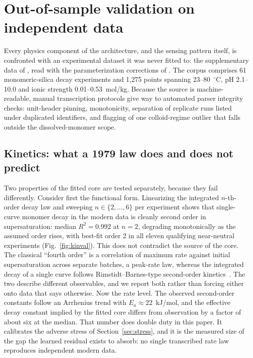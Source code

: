 \section{Out-of-sample validation on independent data}\label{sec:validation}

Every physics component of the architecture, and the sensing pattern
itself, is confronted with an experimental dataset it was never fitted
to: the supplementary data of \citet{scott2024silica}, read with the
parameterization corrections of \citet{scott2024corrigendum}. The
corpus comprises 61 monomeric-silica decay experiments and 1{,}275
points spanning 23--80~$^{\circ}$C, pH 2.1--10.0 and ionic strength
0.01--0.53~mol/kg. Because the source is machine-readable, manual
transcription protocols give way to automated parser integrity checks:
unit-header pinning, monotonicity, separation of replicate runs listed
under duplicated identifiers, and flagging of one colloid-regime
outlier that falls outside the dissolved-monomer scope.

\subsection{Kinetics: what a 1979 law does and does not predict}

Two properties of the fitted core are tested separately, because they
fail differently. Consider first the functional form. Linearizing the
integrated $n$-th-order decay law and sweeping $n \in \{2,\dots,6\}$
per experiment shows that single-curve monomer decay in the modern data
is cleanly second order in supersaturation: median $R^2 = 0.992$ at
$n = 2$, degrading monotonically as the assumed order rises, with
best-fit order 2 in all eleven qualifying near-neutral experiments
(Fig.~\ref{fig:kinval}). This does not contradict the source of the
core. The classical ``fourth order'' is a correlation of maximum rate
against initial supersaturation across separate batches, a peak-rate
law, whereas the integrated decay of a single curve follows
Rimstidt--Barnes-type second-order
kinetics~\citep{rimstidt1980kinetics}. The two describe different
observables, and we report both rather than forcing either onto data
that says otherwise. Now the rate level. The observed second-order
constants follow an Arrhenius trend with $E_a \approx 22$~kJ/mol, and
the effective decay constant implied by the fitted core differs from
observation by a factor of about six at the median. That number does
double duty in this paper. It calibrates the adverse stress of
Section~\ref{sec:stress}, and it is the measured size of the gap the
learned residual exists to absorb: no single transcribed rate law
reproduces independent modern data.

